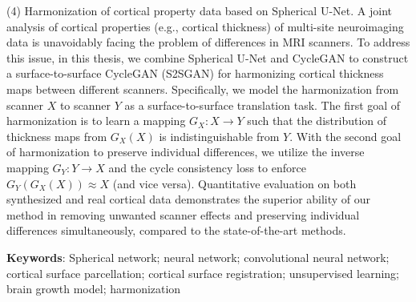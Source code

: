 (4)	Harmonization of cortical property data based on Spherical U-Net. A joint analysis of cortical properties (e.g., cortical thickness) of multi-site neuroimaging data is unavoidably facing the problem of differences in MRI scanners. To address this issue, in this thesis, we combine Spherical U-Net and CycleGAN to construct a surface-to-surface CycleGAN (S2SGAN) for harmonizing cortical thickness maps between different scanners. Specifically, we model the harmonization from scanner $X$ to scanner $Y$ as a surface-to-surface translation task. The first goal of harmonization is to learn a mapping $G_X: X\rightarrow Y$ such that the distribution of thickness maps from $G_X(X)$ is indistinguishable from $Y$. With the second goal of harmonization to preserve individual differences, we utilize the inverse mapping $G_Y: Y\rightarrow X$ and the cycle consistency loss to enforce $G_Y(G_X(X))\approx X$ (and vice versa). Quantitative evaluation on both synthesized and real cortical data demonstrates the superior ability of our method in removing unwanted scanner effects and preserving individual differences simultaneously, compared to the state-of-the-art methods.
 
\textbf{Keywords}: Spherical network; neural network; convolutional neural network; cortical surface parcellation; cortical surface registration; unsupervised learning; brain growth model; harmonization